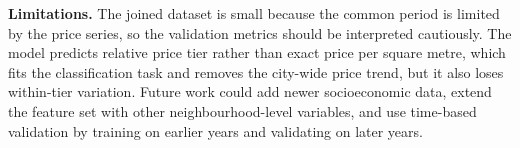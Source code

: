 \documentclass[11pt]{article}
\begin{document}
\textbf{Limitations.} The joined dataset is small because the common period is limited by the price series, so the validation metrics should be interpreted cautiously. The model predicts relative price tier rather than exact price per square metre, which fits the classification task and removes the city-wide price trend, but it also loses within-tier variation. Future work could add newer socioeconomic data, extend the feature set with other neighbourhood-level variables, and use time-based validation by training on earlier years and validating on later years.
\end{document}
